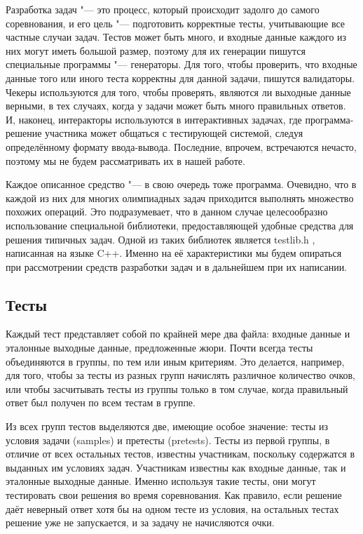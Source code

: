 Разработка задач "--- это процесс, который происходит задолго до самого соревнования, и его цель "--- подготовить корректные тесты, учитывающие все частные случаи задач. Тестов может быть много, и входные данные каждого из них могут иметь большой размер, поэтому для их генерации пишутся специальные программы "--- генераторы. Для того, чтобы проверить, что входные данные того или иного теста корректны для данной задачи, пишутся валидаторы. Чекеры используются для того, чтобы проверять, являются ли выходные данные верными, в тех случаях, когда у задачи может быть много правильных ответов. И, наконец, интеракторы используются в интерактивных задачах, где программа-решение участника может общаться с тестирующей системой, следуя определённому формату ввода-вывода. Последние, впрочем, встречаются нечасто, поэтому мы не будем рассматривать их в нашей работе.

Каждое описанное средство "--- в свою очередь тоже программа. Очевидно, что в каждой из них для многих олимпиадных задач приходится выполнять множество похожих операций. Это подразумевает, что в данном случае целесообразно использование специальной библиотеки, предоставляющей удобные средства для решения типичных задач. Одной из таких библиотек является testlib.h \cite{testlib}, написанная на языке C++. Именно на её характеристики мы будем опираться при рассмотрении средств разработки задач и в дальнейшем при их написании.

\subsection*{Тесты}

Каждый тест представляет собой по крайней мере два файла: входные данные и эталонные выходные данные, предложенные жюри. Почти всегда тесты объединяются в группы, по тем или иным критериям. Это делается, например, для того, чтобы за тесты из разных групп начислять различное количество очков, или чтобы засчитывать тесты из группы только в том случае, когда правильный ответ был получен по всем тестам в группе.

Из всех групп тестов выделяются две, имеющие особое значение: тесты из условия задачи (samples) и претесты (pretests). Тесты из первой группы, в отличие от всех остальных тестов, известны участникам, поскольку содержатся в выданных им условиях задач. Участникам известны как входные данные, так и эталонные выходные данные. Именно используя такие тесты, они могут тестировать свои решения во время соревнования. Как правило, если решение даёт неверный ответ хотя бы на одном тесте из условия, на остальных тестах решение уже не запускается, и за задачу не начисляются очки.

